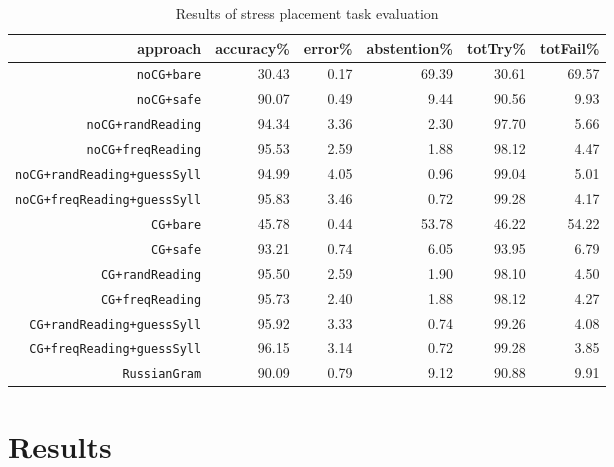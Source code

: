 \documentclass[11pt]{article}
\begin{document}
\begin{table*}[t]
  \centering
  \begin{tabular}{r | r r r | r r }
    approach & accuracy\% & error\% & abstention\% & totTry\% & totFail\% \\
    \hline
    \hline
    {\small {\tt noCG+bare}} & 30.43 & 0.17 & 69.39 & 30.61 & 69.57 \\
    {\small {\tt noCG+safe}} & 90.07 & 0.49 & 9.44 & 90.56 & 9.93 \\
    {\small {\tt noCG+randReading}} & 94.34 & 3.36 & 2.30 & 97.70 & 5.66 \\
    {\small {\tt noCG+freqReading}} & 95.53 & 2.59 & 1.88 & 98.12 & 4.47 \\
    {\small {\tt noCG+randReading+guessSyll}} & 94.99 & 4.05 & 0.96 & 99.04 & 5.01 \\
    {\small {\tt noCG+freqReading+guessSyll}} & 95.83 & 3.46 & 0.72 & 99.28 & 4.17 \\
    \hline
    {\small {\tt CG+bare}} & 45.78 & 0.44 & 53.78 & 46.22 & 54.22 \\
    {\small {\tt CG+safe}} & 93.21 & 0.74 & 6.05 & 93.95 & 6.79 \\
    {\small {\tt CG+randReading}} & 95.50 & 2.59 & 1.90 & 98.10 & 4.50 \\
    {\small {\tt CG+freqReading}} & 95.73 & 2.40 & 1.88 & 98.12 & 4.27 \\
    {\small {\tt CG+randReading+guessSyll}} & 95.92 & 3.33 & 0.74 & 99.26 & 4.08 \\
    {\small {\tt CG+freqReading+guessSyll}} & 96.15 & 3.14 & 0.72 & 99.28 & 3.85 \\
    \hline
    {\small {\tt RussianGram}} & 90.09 & 0.79 & 9.12 & 90.88 & 9.91
  \end{tabular}
  \caption{Results of stress placement task evaluation}
  \label{tab:results}
\end{table*}

\section{Results}
\end{document}
